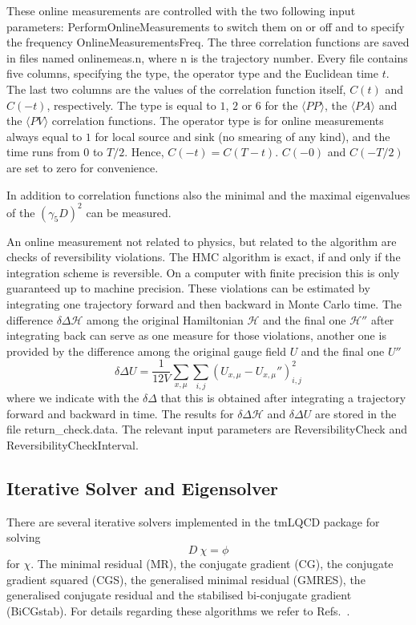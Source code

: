 These online measurements are controlled with the two following input
parameters: {\ttfamily PerformOnlineMeasurements} to switch them on or
off and to specify the frequency {\ttfamily OnlineMeasurementsFreq}. The three
correlation functions are saved in files named {\ttfamily
  onlinemeas.n}, where {\ttfamily n} is the trajectory number. Every
file contains five columns, specifying the type, the operator type and the
Euclidean time $t$. The last two columns are the values of the
correlation function itself, $C(t)$ and $C(-t)$, respectively. The
type is equal to $1$, $2$ or $6$ for the $\langle P P\rangle$, the
$\langle PA\rangle$ and the $\langle PV\rangle$ correlation
functions. The operator type is for online measurements always equal
to $1$ for local source and sink (no smearing of any kind), and the
time runs from $0$ to $T/2$. Hence, $C(-t)= C(T-t)$. $C(-0)$ and
$C(-T/2)$ are set to zero for convenience.

In addition to correlation functions also the minimal and the maximal
eigenvalues of the $(\gamma_5 D)^2$ can be measured.

An online measurement not related to physics, but related to the
algorithm are checks of reversibility violations. The HMC algorithm is
exact, if 
and only if the integration scheme is reversible. On a computer with
finite precision this is only guaranteed up to machine precision.
These violations can be estimated by integrating one trajectory
forward and then backward in Monte Carlo time. The difference
$\delta\Delta\mathcal{H}$ among
the original Hamiltonian $\mathcal{H}$ and the final one
$\mathcal{H}''$ after integrating back can serve as one measure for
those violations, another one is provided by the difference among the
original gauge field $U$ and the final one $U''$
\[
\delta\Delta U = \frac{1}{12V}
\sum_{x,\mu}\sum_{i,j} (U_{x,\mu}-U_{x,\mu}'')_{i,j}^2
\]
where we indicate with the $\delta\Delta$ that this is obtained after
integrating a trajectory forward and backward in time. The results for
$\delta\Delta \mathcal{H}$ and $\delta\Delta U$ are
stored in the file {\ttfamily return\_check.data}. The relevant input
parameters are {\ttfamily ReversibilityCheck} and {\ttfamily
  ReversibilityCheckInterval}.

\subsection{Iterative Solver and Eigensolver}

There are several iterative solvers implemented in the tmLQCD
package for solving 
\[
D\ \chi = \phi
\]
for $\chi$. The minimal residual (MR), the conjugate gradient (CG), the
conjugate gradient squared (CGS), the generalised minimal residual
(GMRES), the generalised conjugate residual and the stabilised
bi-conjugate gradient (BiCGstab). For details regarding these
algorithms we refer to Refs.~\cite{saad:2003a,meister:1999}.

